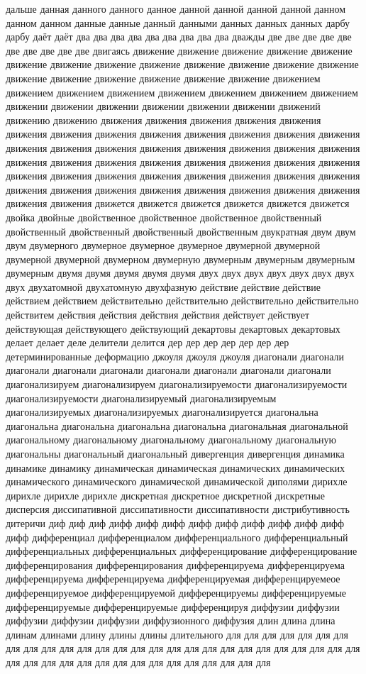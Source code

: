 дальше данная данного данного данное данной данной данной данной данном данном данном данные данные данный данными данных данных данных дарбу дарбу даёт даёт два два два два два два два два два дважды две две две две две две две две две две двигаясь движение движение движение движение движение движение движение движение движение движение движение движение движение движение движение движение движение движение движение движением движением движением движением движением движением движением движением движении движении движении движении движении движении движений движению движению движения движения движения движения движения движения движения движения движения движения движения движения движения движения движения движения движения движения движения движения движения движения движения движения движения движения движения движения движения движения движения движения движения движения движения движения движения движения движения движения движения движения движения движения движения движения движения движется движется движется движется движется движется двойка двойные двойственное двойственное двойственное двойственный двойственный двойственный двойственный двойственным двукратная двум двум двум двумерного двумерное двумерное двумерное двумерной двумерной двумерной двумерной двумерном двумерную двумерным двумерным двумерным двумерным двумя двумя двумя двумя двумя двух двух двух двух двух двух двух двух двухатомной двухатомную двухфазную действие действие действие действием действием действительно действительно действительно действительно действитем действия действия действия действия действует действует действующая действующего действующий декартовы декартовых декартовых делает делает деле делители делится дер дер дер дер дер дер дер детерминированные деформацию джоуля джоуля джоуля диагонали диагонали диагонали диагонали диагонали диагонали диагонали диагонали диагонали диагонализируем диагонализируем диагонализируемости диагонализируемости диагонализируемости диагонализируемый диагонализируемым диагонализируемых диагонализируемых диагонализируется диагональна диагональна диагональна диагональна диагональна диагональная диагональной диагональному диагональному диагональному диагональному диагональную диагональны диагональный диагональный дивергенция дивергенция динамика динамике динамику динамическая динамическая динамических динамических динамического динамического динамической динамической диполями дирихле дирихле дирихле дирихле дискретная дискретное дискретной дискретные дисперсия диссипативной диссипативности диссипативности дистрибутивность дитеричи диф диф диф дифф дифф дифф дифф дифф дифф дифф дифф дифф дифф дифференциал дифференциалом дифференциального дифференциальный дифференциальных дифференциальных дифференцирование дифференцирование дифференцирования дифференцирования дифференцируема дифференцируема дифференцируема дифференцируема дифференцируемая дифференцируемеое дифференцируемое дифференцируемой дифференцируемы дифференцируемые дифференцируемые дифференцируемые дифференцируя диффузии диффузии диффузии диффузии диффузии диффузионного диффузия длин длина длина длинам длинами длину длины длины длительного для для для для для для для для для для для для для для для для для для для для для для для для для для для для для для для для для для для для для для для для для для 
